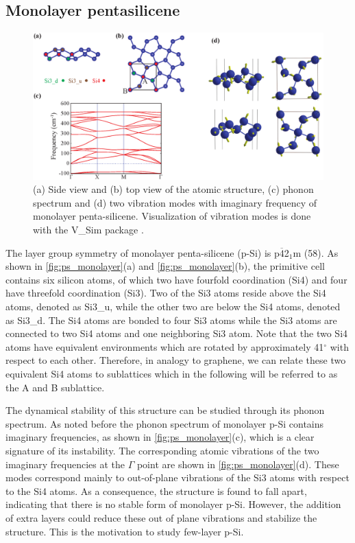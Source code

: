 \subsection{Monolayer pentasilicene}\label{mono}

\begin{figure}[htb]
\centering
\includegraphics[width=\linewidth]{ps_monolayer.eps}%
\caption{(a) Side view and (b) top view of the atomic structure, (c) phonon spectrum and (d) two vibration modes with imaginary frequency of monolayer penta-silicene. Visualization of vibration modes is done with the V\_Sim package \cite{VSim}. \label{fig:ps_monolayer}}
\end{figure}

The layer group symmetry of monolayer penta-silicene (p-Si) is p$\overline{4}$2$_1$m (58). As shown in \autoref{fig:ps_monolayer}(a) and \autoref{fig:ps_monolayer}(b), the primitive cell contains six silicon atoms, of which two have fourfold coordination (Si4) and four have threefold coordination (Si3). Two of the Si3 atoms reside above the Si4 atoms, denoted as Si3\_u, while the other two are below the Si4 atoms, denoted as Si3\_d. The Si4 atoms are bonded to four Si3 atoms while the Si3 atoms are connected to two Si4 atoms and one neighboring Si3 atom. Note that the two Si4 atoms have equivalent environments which are rotated by approximately 41$^{\circ}$ with respect to each other. Therefore, in analogy to graphene, we can relate these two equivalent Si4 atoms to sublattices which in the following will be referred to as the A and B sublattice.

The dynamical stability of this structure can be studied through its phonon spectrum. As noted before\cite{Ding2015,Li2015b} the phonon spectrum of monolayer p-Si contains imaginary frequencies, as shown in \autoref{fig:ps_monolayer}(c), which is a clear signature of its instability. The corresponding atomic vibrations of the two imaginary frequencies at the $\Gamma$ point are shown in \autoref{fig:ps_monolayer}(d). These modes correspond mainly to out-of-plane vibrations of the Si3 atoms with respect to the Si4 atoms. As a consequence, the structure is found to fall apart, indicating that there is no stable form of monolayer p-Si. However, the addition of extra layers could reduce these out of plane vibrations and stabilize the structure. This is the motivation to study few-layer p-Si.


